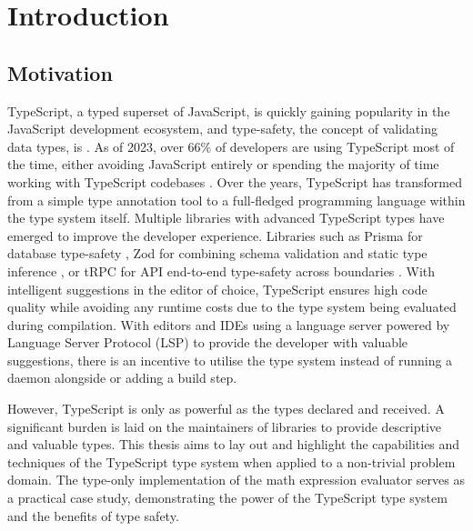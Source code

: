 \chapter{Introduction}

\section{Motivation}

TypeScript, a typed superset of JavaScript, is quickly gaining popularity in the JavaScript development ecosystem, and type-safety, the concept of validating data types, is \cite{jsworldconferenceFredSchottTypesafety2023}. As of 2023, over 66\% of developers are using TypeScript most of the time, either avoiding JavaScript entirely or spending the majority of time working with TypeScript codebases \cite{StateJS2022}. Over the years, TypeScript has transformed from a simple type annotation tool to a full-fledged programming language within the type system itself. Multiple libraries with advanced TypeScript types have emerged to improve the developer experience. Libraries such as Prisma for database type-safety \cite{PrismaPrismaNextgeneration}, Zod for combining schema validation and static type inference \cite{mcdonnellZod2023}, or tRPC for API end-to-end type-safety across boundaries \cite{TRPC2023}. With intelligent suggestions in the editor of choice, TypeScript ensures high code quality while avoiding any runtime costs due to the type system being evaluated during compilation. With editors and IDEs using a language server powered by Language Server Protocol (LSP) to provide the developer with valuable suggestions, there is an incentive to utilise the type system instead of running a daemon alongside or adding a build step.

However, TypeScript is only as powerful as the types declared and received. A significant burden is laid on the maintainers of libraries to provide descriptive and valuable types. This thesis aims to lay out and highlight the capabilities and techniques of the TypeScript type system when applied to a non-trivial problem domain. The type-only implementation of the math expression evaluator serves as a practical case study, demonstrating the power of the TypeScript type system and the benefits of type safety.

